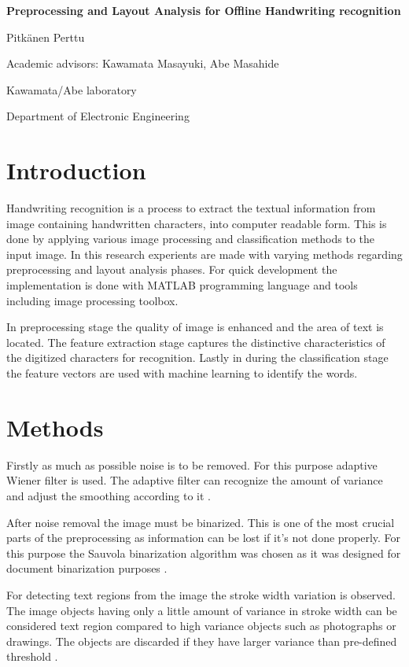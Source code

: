 \documentclass{article}
\begin{document}
  \begin{multicols}{2}
    \begin{center}

    \large
    \textbf{Preprocessing and Layout Analysis for Offline Handwriting recognition}

    \normalsize
      Pitk{\"a}nen Perttu

      Academic advisors: Kawamata Masayuki, Abe Masahide

      Kawamata/Abe laboratory

      Department of Electronic Engineering
      \end{center}

      \section*{Introduction}
        Handwriting recognition is a process to extract the textual information from image containing handwritten characters, into computer readable form. This is done by applying various image processing and classification methods to the input image. In this research experients are made with varying methods regarding preprocessing and layout analysis phases. For quick development the implementation is done with MATLAB programming language and tools including image processing toolbox.

      	In preprocessing stage the quality of image is enhanced and the area of text is located.  The feature extraction stage captures the distinctive characteristics of the digitized characters for recognition. Lastly in during the classification stage the feature vectors are used with machine learning to identify the  words.

      \section*{Methods}
        Firstly as much as possible noise is to be removed. For this purpose adaptive Wiener filter is used. The adaptive filter can recognize the amount of variance and adjust the smoothing according to it  \cite{TheMathWorksWiener}.

      	After noise removal the image must be binarized. This is one of the most crucial parts of the preprocessing as information can be lost if it's not done properly. For this purpose the Sauvola binarization algorithm was chosen as it was designed for document binarization purposes \cite{Sauvola2000}.

      	For detecting text regions from the image the stroke width variation is observed. The image objects having only a little amount of variance in stroke width can be considered text region compared to high variance objects such as photographs or drawings. The objects are discarded if they have larger variance than pre-defined threshold \cite{MathworksTextRecognition}.


\end{multicols}
\end{document}
